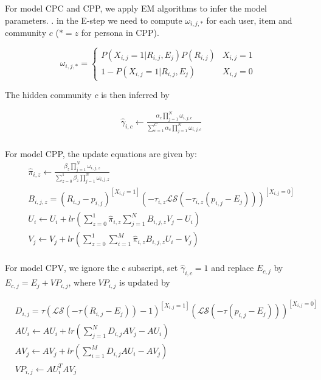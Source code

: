 \documentclass[sigconf]{acmart}
\begin{document}
For model CPC and CPP, we apply EM algorithms to infer the model parameters. . in the E-step we need to compute $\omega_{i,j,*}$ for each user, item and community $c$ ($*=z$ for persona in CPP). 

\begin{equation}
\omega_{i,j,*}=
\begin{cases}
P(X_{i,j}=1|R_{i,j},E_{j})P(R_{i,j})& \text{$X_{i,j}=1$}\\\nonumber
1-P(X_{i,j}=1|R_{i,j},E_{j})& \text{$X_{i,j}=0$}
\end{cases}
\end{equation}

The hidden community $c$ is then inferred by

\begin{equation}\label{equ:updateCPC}
\begin{split}
&\hat{\gamma}_{i,c}\leftarrow\frac{\alpha_c\prod_{j=1}^{N}\omega_{i,j,c}}{\sum_{c=1}^{C}\alpha_c\prod_{j=1}^{N}\omega_{i,j,c}} \\
\end{split}
\end{equation}

For model CPP, the update equations are given by:
\begin{equation}
\begin{split}
&\hat{\pi}_{i,z}\leftarrow\frac{\beta_z\prod_{j=1}^{N}\omega_{i,j,z}}{\sum_{z=0}^{1}\beta_z\prod_{j=1}^{N}\omega_{i,j,z}} \\
&B_{i,j,z}=(R_{i,j}-p_{i,j})^{[X_{i,j}=1]}(-\tau_{i,z}\mathcal{LS}(-\tau_{i,z}(p_{i,j}-E_{j})))^{[X_{i,j}=0]} \\
&U_{i}\leftarrow U_{i}+lr(\sum\limits_{z=0}^{1}\hat{\pi}_{i,z}\sum\limits_{j=1}^{N}B_{i,j,z}V_j-U_{i}) \\
&V_j\leftarrow V_j+lr(\sum\limits_{z=0}^{1}\sum\limits_{i=1}^{M}\hat{\pi}_{i,z}B_{i,j,z}U_{i}-V_j) \\
\end{split}
\end{equation}

For  model CPV,  we ignore the c subscript, set $\hat{\gamma}_{i,c}=1$ and replace $E_{c,j}$ by $E_{c,j}=E_{j}+VP_{i,j}$, where $VP_{i,j}$ is updated by

\begin{equation}
\begin{split}
&D_{i,j}=\tau(\mathcal{LS}(-\tau(R_{i,j}-E_{j}))-1)^{[X_{i,j}=1]}(\mathcal{LS}(-\tau(p_{i,j}-E_{j})))^{[X_{i,j}=0]} \\
&AU_{i}\leftarrow AU_{i}+lr(\sum\limits_{j=1}^{N}D_{i,j}AV_j-AU_{i}) \\
&AV_{j}\leftarrow AV_{j}+lr(\sum\limits_{i=1}^{M}D_{i,j}AU_{i}-AV_j) \\
&VP_{i,j} \leftarrow AU_{i}^{T}AV_{j} \\
\end{split}
\end{equation}
\end{document}
